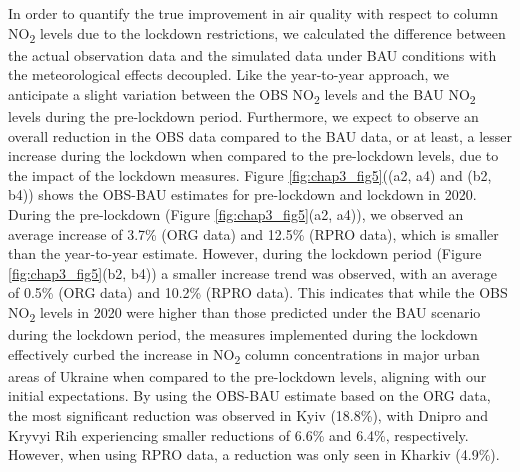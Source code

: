 In order to quantify the true improvement in air quality with respect to column NO\textsubscript{2} levels due to the lockdown restrictions, we calculated the difference between the actual observation data and the simulated data under BAU conditions with the meteorological effects decoupled. Like the year-to-year approach, we anticipate a slight variation between the OBS NO\textsubscript{2} levels and the BAU NO\textsubscript{2} levels during the pre-lockdown period. Furthermore, we expect to observe an overall reduction in the OBS data compared to the BAU data, or at least, a lesser increase during the lockdown when compared to the pre-lockdown levels, due to the impact of the lockdown measures. Figure \ref{fig:chap3_fig5}((a2, a4) and (b2, b4)) shows the OBS-BAU estimates for pre-lockdown and lockdown in 2020. During the pre-lockdown (Figure \ref{fig:chap3_fig5}(a2, a4)), we observed an average increase of 3.7\% (ORG data) and 12.5\% (RPRO data), which is smaller than the year-to-year estimate. However, during the lockdown period (Figure \ref{fig:chap3_fig5}(b2, b4)) a smaller increase trend was observed, with an average of 0.5\% (ORG data) and 10.2\% (RPRO data). This indicates that while the OBS NO\textsubscript{2} levels in 2020 were higher than those predicted under the BAU scenario during the lockdown period, the measures implemented during the lockdown effectively curbed the increase in NO\textsubscript{2} column concentrations in major urban areas of Ukraine when compared to the pre-lockdown levels, aligning with our initial expectations. By using the OBS-BAU estimate based on the ORG data, the most significant reduction was observed in Kyiv (18.8\%), with Dnipro and Kryvyi Rih experiencing smaller reductions of 6.6\% and 6.4\%, respectively. However, when using RPRO data, a reduction was only seen in Kharkiv (4.9\%).\par

